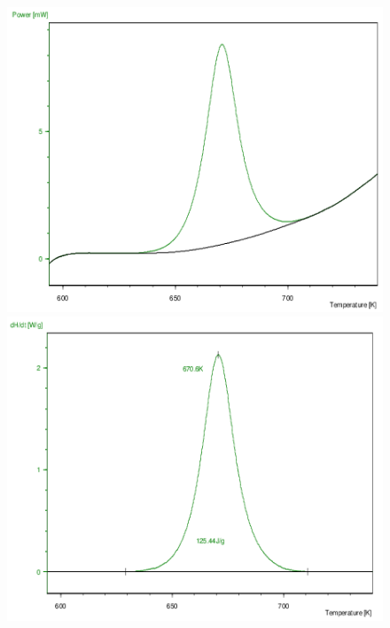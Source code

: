 \documentclass[12pt,a4paper]{article}
\begin{document}
\begin{figure}[!htb]
  \includegraphics[width=\linewidth]{8fin}
\endminipage
\hspace*{10pt}
  \includegraphics[width=\linewidth]{9fin}
\endminipage
\\
\hspace*{-20pt}

\end{figure}
\end{document}
